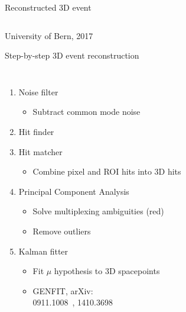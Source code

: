 \documentclass[]{beamer}
\begin{document}
\begin{frame}{Reconstructed 3D event}
\begin{columns}[c]
	\end{columns}
	\centering
	{\tiny University of Bern, 2017}\\
\end{frame}

\begin{frame}{Step-by-step 3D event reconstruction}
	\begin{columns}[c]
		\begin{enumerate}
			\item<1-> Noise filter
			\begin{itemize}
				\item Subtract common mode noise
			\end{itemize}
			\item<2-> Hit finder
			\item<2-> Hit matcher
			\begin{itemize}
				\item Combine pixel and ROI hits into 3D hits
			\end{itemize}
			\item<3-> Principal Component Analysis
			\begin{itemize}
				\item Solve multiplexing ambiguities (red)
				\item Remove outliers
			\end{itemize}
			\item<4-> Kalman fitter
			\begin{itemize}
				\item Fit $\mu$ hypothesis to 3D spacepoints
				\item GENFIT, arXiv:\\0911.1008~\cite{genfit1}, 1410.3698~\cite{genfit2}
			\end{itemize}
		\end{enumerate}
		\centering

\end{columns}
\end{frame}
\end{document}
